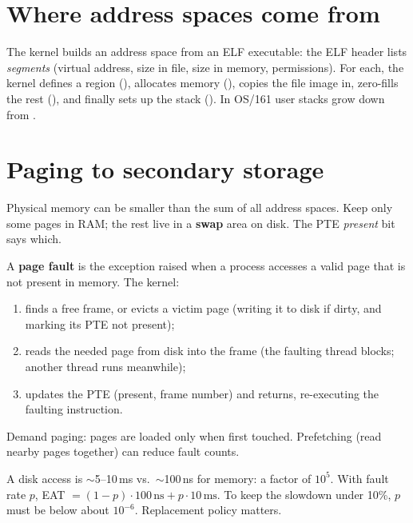 \section{Where address spaces come from}
The kernel builds an address space from an ELF executable: the ELF header lists
\emph{segments} (virtual address, size in file, size in memory, permissions). For each, the
kernel defines a region (), allocates memory (),
copies the file image in, zero-fills the rest (), and finally sets up the stack
(). In OS/161 user stacks grow down from .

\section{Paging to secondary storage}

Physical memory can be smaller than the sum of all address spaces. Keep only some pages in RAM;
the rest live in a \textbf{swap} area on disk. The PTE \emph{present} bit says which.

\begin{definition}
A \textbf{page fault} is the exception raised when a process accesses a valid page that is not
present in memory. The kernel:
\begin{enumerate}
  \item finds a free frame, or evicts a victim page (writing it to disk if dirty, and marking
    its PTE not present);
  \item reads the needed page from disk into the frame (the faulting thread blocks; another
    thread runs meanwhile);
  \item updates the PTE (present, frame number) and returns, re-executing the faulting
    instruction.
\end{enumerate}
\end{definition}

Demand paging: pages are loaded only when first touched. Prefetching (read nearby pages
together) can reduce fault counts.

\begin{important}[Cost]
A disk access is $\sim$5--10\,ms vs.\ $\sim$100\,ns for memory: a factor of $10^{5}$. With fault
rate $p$, EAT $= (1-p)\cdot 100\,\text{ns} + p \cdot 10\,\text{ms}$. To keep the slowdown under
10\%, $p$ must be below about $10^{-6}$. Replacement policy matters.
\end{important}

